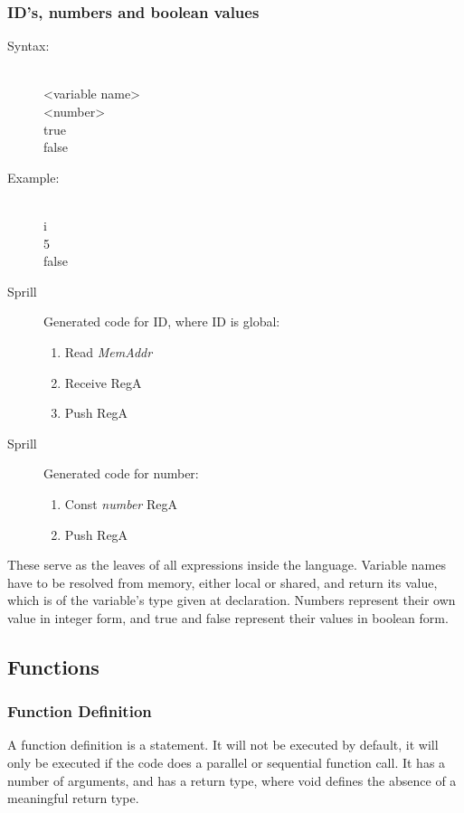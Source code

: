 \documentclass[10pt,a4paper]{report}
\begin{document}
\subsubsection*{ID's, numbers and boolean values}
\begin{description}
	\item[Syntax:] \hfill \\ 
		 \textless variable name\textgreater \\
		 \textless number\textgreater \\
		 true\\
		 false
	\item[Example:] \hfill \\
		i\\ 
		5\\
		false
	\item[Sprill] Generated code for ID, where ID is global:
		\begin{enumerate}
			\item Read \emph{MemAddr}
			\item Receive RegA
			\item Push RegA
		\end{enumerate}
	\item[Sprill] Generated code for number:
		\begin{enumerate}
			\item Const \emph{number} RegA
			\item Push RegA
		\end{enumerate}
\end{description}
These serve as the leaves of all expressions inside the language. Variable names have to be resolved from memory, either local or shared, and return its value, which is of the variable's type given at declaration. Numbers represent their own value in integer form, and true and false represent their values in boolean form.

\subsection{Functions} \label{subsec:functions}
\subsubsection{Function Definition}
A function definition is a statement. It will not be executed by default, it will only be executed if the code does a parallel or sequential function call. It has a number of arguments, and has a return type, where void defines the absence of a meaningful return 
type.
\end{document}
